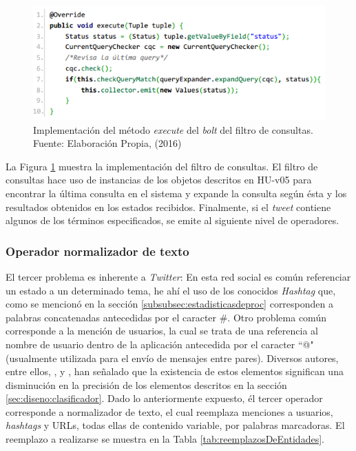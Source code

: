 \begin{figure}[H]
	\centering
	\captionsetup{justification=centering}
	\includegraphics[scale=0.8]{images/FilterBolt.png}
	\caption[Implementación del método \textit{execute} del \textit{bolt} del filtro de consultas.]{Implementación del método \textit{execute} del \textit{bolt} del filtro de consultas.\\Fuente: Elaboración Propia, (2016)}
	\label{fig:operadorFiltro}
\end{figure}

La Figura \ref{fig:operadorFiltro} muestra la implementación del filtro de consultas. El filtro de consultas hace uso de instancias de los objetos descritos en HU-v05 para encontrar la última consulta en el sistema y expande la consulta según ésta y los resultados obtenidos en los estados recibidos. Finalmente, si el \textit{tweet} contiene algunos de los términos especificados, se emite al siguiente nivel de operadores.

\subsubsection*{Operador normalizador de texto}
\label{subsubsec:3op}

El tercer problema es inherente a \textit{Twitter}: En esta red social es común referenciar un estado a un determinado tema, he ahí el uso de los conocidos \textit{Hashtag} que, como se mencionó en la sección \ref{subsubsec:estadisticasdeproc} corresponden a palabras concatenadas antecedidas por el caracter \#. Otro problema común corresponde a la mención de usuarios, la cual se trata de una referencia al nombre de usuario dentro de la aplicación antecedida por el caracter ``@" (usualmente utilizada para el envío de mensajes entre pares). Diversos autores, entre ellos, \citep{NLPaccuracy}, \citep{NLPaccuracy1} y \citep{NLPaccuracy2}, han señalado que la existencia de estos elementos significan una disminución en la precisión de los elementos descritos en la sección \ref{sec:diseno:clasificador}. Dado lo anteriormente expuesto, él tercer operador corresponde a normalizador de texto, el cual reemplaza menciones a usuarios, \textit{hashtags} y URLs, todas ellas de contenido variable, por palabras marcadoras. El reemplazo a realizarse se muestra en la Tabla \ref{tab:reemplazosDeEntidades}.

